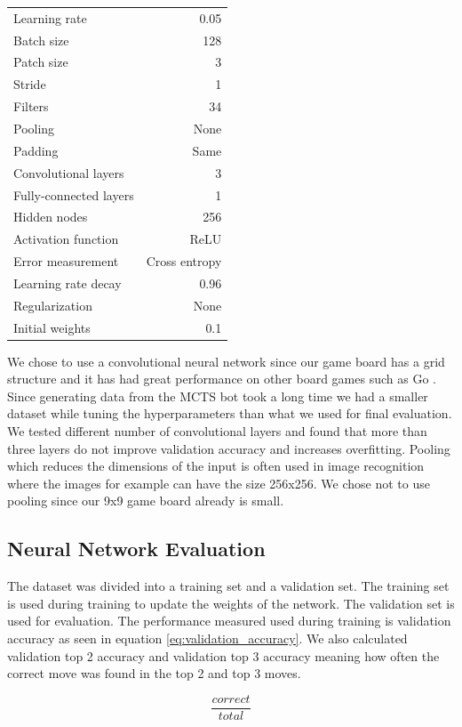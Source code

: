 \documentclass{kththesis}
\begin{document}
\begin{tabular}{ l | r }
Learning rate & 0.05 \\
Batch size & 128 \\
Patch size & 3 \\
Stride & 1 \\
Filters & 34 \\
Pooling & None \\
Padding & Same \\
Convolutional layers & 3 \\
Fully-connected layers & 1 \\
Hidden nodes & 256 \\
Activation function & ReLU \\
Error measurement & Cross entropy \\
Learning rate decay & 0.96 \\
Regularization & None \\
Initial weights & 0.1 \\
\end{tabular}

We chose to use a convolutional neural network since our game board has a grid structure and it has had great performance on other board games such as Go \cite{alphaGo2016}. Since generating data from the MCTS bot took a long time we had a smaller dataset while tuning the hyperparameters than what we used for final evaluation. We tested different number of convolutional layers and found that more than three layers do not improve validation accuracy and increases overfitting. Pooling which reduces the dimensions of the input is often used in image recognition where the images for example can have the size 256x256. We chose not to use pooling since our 9x9 game board already is small.

\subsection{Neural Network Evaluation}
The dataset was divided into a training set and a validation set. The training set is used during training to update the weights of the network. The validation set is used for evaluation. The performance measured used during training is validation accuracy as seen in equation \ref{eq:validation_accuracy}.  We also calculated validation top 2 accuracy and validation top 3 accuracy meaning how often the correct move was found in the top 2 and top 3 moves.

\begin{equation}
\label{eq:validation_accuracy}
\frac{correct}{total}
\end{equation}
\end{document}
